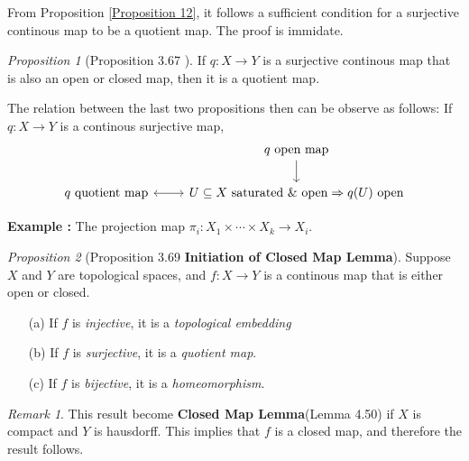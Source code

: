 \documentclass[a4paper]{article}
\theoremstyle{remark}
\newtheorem*{remark}{Remark}
\newtheorem{prop}{Proposition}
\newcommand{\subhim}{\subseteq} %
\begin{document}
From Proposition \ref{Proposition 12}, it follows a sufficient condition for a surjective continous map to be a quotient map. The proof is immidate.

\begin{prop}[Proposition 3.67 \cite{LeeTM}]
	If $q : X \to Y$ is a surjective continous map that is also an open or closed map, then it is a quotient map.
\end{prop}

The relation between the last two propositions then can be observe as follows:
If $q : X \to Y$ is a continous surjective map,
\[
\begin{tikzcd}
&  q \text{ open map} \arrow[d] \\
q \text{ quotient map} \arrow[r,leftrightarrow] & U\subhim X \text{ saturated \& open} \Rightarrow q(U) \text{ open}
\end{tikzcd}
\]

\textbf{Example :} The projection map $\pi_i : X_1 \times \cdots \times X_k \to X_i.$

\begin{prop}[Proposition 3.69 \cite{LeeTM} \textbf{Initiation of Closed Map Lemma}]
	Suppose $X$ and $Y$ are topological spaces, and $f : X \to Y$ is a continous map that is either open or closed.
	\begin{enumerate}[nolistsep]
		\item [(a)] If $f$ is \textit{injective}, it is a \textit{topological embedding}
		\item [(b)] If $f$ is \textit{surjective}, it is a \textit{quotient map}.
		\item [(c)] If $f$ is \textit{bijective}, it is a \textit{homeomorphism}. 
	\end{enumerate}
\end{prop}
\begin{remark}
	This result become \textbf{Closed Map Lemma}(Lemma 4.50) if $X$ is compact and $Y$ is hausdorff. This implies that $f$ is a closed map, and therefore the result follows. 
\end{remark}
\end{document}
